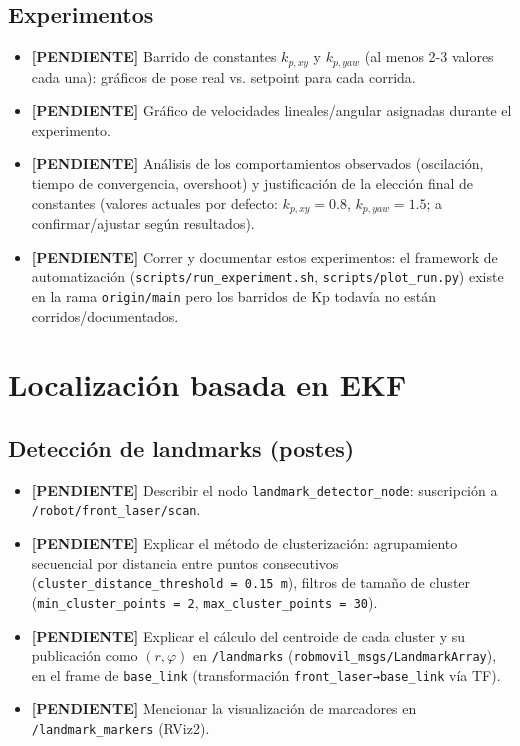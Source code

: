 \documentclass[11pt,a4paper]{article}
\newcommand{\TODO}[1]{\textcolor{todocolor}{\textbf{[PENDIENTE]} #1}}
\newenvironment{tareas}{\begin{itemize}\setlength{\itemsep}{2pt}}{\end{itemize}}
\begin{document}
\subsection{Experimentos}
\begin{tareas}
    \item \TODO{Barrido de constantes $k_{p,xy}$ y $k_{p,yaw}$ (al menos 2-3 valores cada una): gráficos de pose real vs. setpoint para cada corrida.}
    \item \TODO{Gráfico de velocidades lineales/angular asignadas durante el experimento.}
    \item \TODO{Análisis de los comportamientos observados (oscilación, tiempo de convergencia, overshoot) y justificación de la elección final de constantes (valores actuales por defecto: $k_{p,xy}=0.8$, $k_{p,yaw}=1.5$; a confirmar/ajustar según resultados).}
    \item \TODO{Correr y documentar estos experimentos: el framework de automatización (\texttt{scripts/run\_experiment.sh}, \texttt{scripts/plot\_run.py}) existe en la rama \texttt{origin/main} pero los barridos de Kp todavía no están corridos/documentados.}
\end{tareas}

\section{Localización basada en EKF}
\subsection{Detección de landmarks (postes)}
\begin{tareas}
    \item \TODO{Describir el nodo \texttt{landmark\_detector\_node}: suscripción a \texttt{/robot/front\_laser/scan}.}
    \item \TODO{Explicar el método de clusterización: agrupamiento secuencial por distancia entre puntos consecutivos (\texttt{cluster\_distance\_threshold = 0.15 m}), filtros de tamaño de cluster (\texttt{min\_cluster\_points = 2}, \texttt{max\_cluster\_points = 30}).}
    \item \TODO{Explicar el cálculo del centroide de cada cluster y su publicación como $(r, \varphi)$ en \texttt{/landmarks} (\texttt{robmovil\_msgs/LandmarkArray}), en el frame de \texttt{base\_link} (transformación \texttt{front\_laser→base\_link} vía TF).}
    \item \TODO{Mencionar la visualización de marcadores en \texttt{/landmark\_markers} (RViz2).}
\end{tareas}
\end{document}
